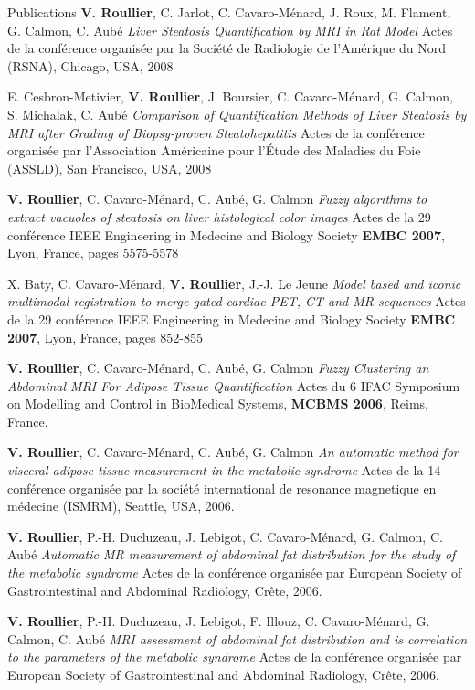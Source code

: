 \begin{rubric}{Publications}
  \entry*[2008]       
  \textbf{V. Roullier}, C. Jarlot, C. Cavaro-Ménard, J. Roux, M. Flament, G. Calmon, C. Aubé
  \textit{Liver Steatosis Quantification by MRI in Rat Model} 
  Actes de la conférence organisée par la Société de Radiologie de l'Amérique du Nord (RSNA), Chicago, USA, 2008 

  \entry*[2008]
  E. Cesbron-Metivier, \textbf{V. Roullier}, J. Boursier, C. Cavaro-Ménard, G. Calmon, S. Michalak, C. Aubé       
  \textit{Comparison of Quantification Methods of Liver Steatosis by MRI after Grading of Biopsy-proven Steatohepatitis} 
  Actes de la conférence organisée par l'Association Américaine pour l'\'Etude des Maladies du Foie (ASSLD), San Francisco, USA, 2008 
  
  \entry*[2007]
  \textbf{V. Roullier}, C. Cavaro-Ménard, C. Aubé, G. Calmon 
  \textit{Fuzzy algorithms to extract vacuoles of steatosis on liver histological color images}
  Actes de la 29  conférence IEEE Engineering in Medecine and Biology Society \textbf{EMBC 2007}, Lyon, France, pages 5575-5578

  \entry*[2007] 
  X. Baty, C. Cavaro-Ménard, \textbf{V. Roullier}, J.-J. Le Jeune
  \textit{Model based and iconic multimodal registration to merge gated cardiac PET, CT and MR sequences}
  Actes de la 29  conférence IEEE Engineering in Medecine and Biology Society \textbf{EMBC 2007}, Lyon, France, pages 852-855

  \entry*[2006]
  \textbf{V. Roullier}, C. Cavaro-Ménard, C. Aubé, G. Calmon
  \textit{Fuzzy Clustering an Abdominal MRI For Adipose Tissue Quantification}
  Actes du 6 IFAC Symposium on Modelling and Control in BioMedical Systems, \textbf{MCBMS 2006}, Reims, France.

  \entry*[2006]
  \textbf{V. Roullier}, C. Cavaro-Ménard, C. Aubé, G. Calmon
  \textit{An automatic method for visceral adipose tissue measurement in the metabolic syndrome} 
  Actes de la 14 conférence organisée par la société international de resonance magnetique en médecine (ISMRM), Seattle, USA, 2006.

  \entry*[2006]
  \textbf{V. Roullier}, P.-H. Ducluzeau, J. Lebigot, C. Cavaro-Ménard, G. Calmon, C. Aubé
  \textit{Automatic MR measurement of abdominal fat distribution for the study of the metabolic syndrome}
  Actes de la conférence organisée par European Society of Gastrointestinal and Abdominal Radiology, Crête, 2006.

  \entry*[2006]
  \textbf{V. Roullier}, P.-H. Ducluzeau, J. Lebigot, F. Illouz, C. Cavaro-Ménard, G. Calmon, C. Aubé
  \textit{MRI assessment of abdominal fat distribution and is correlation to the parameters of the metabolic syndrome} 
  Actes de la conférence organisée par European Society of Gastrointestinal and Abdominal Radiology, Crête, 2006.


\end{rubric}
